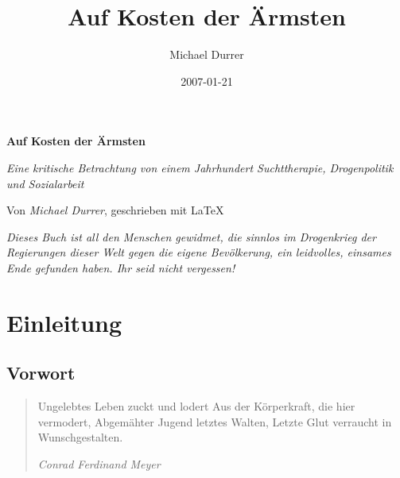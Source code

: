 \documentclass[b5paper,10pt,dvips,fleqn,titlepage,twoside]{book}
\author{Michael Durrer}
\title{Auf Kosten der Ärmsten}
\date{2007-01-21}
\begin{document}
\begin{titlepage}
\begin{center}
\begin{huge} \textbf{Auf Kosten der Ärmsten}\end{huge}
\newline
\textit{Eine kritische Betrachtung von einem Jahrhundert Suchttherapie, Drogenpolitik und Sozialarbeit}
\newline


\begin{small}Von \emph{Michael Durrer}, geschrieben mit \LaTeX \newline\end{small}
\end{center}
\end{titlepage}
\newpage
\tableofcontents
\newpage
\begin{center}
 \textit{Dieses Buch ist all den \emph{Menschen} gewidmet, die sinnlos im Drogenkrieg der Regierungen dieser Welt gegen die eigene Bevölkerung, ein leidvolles, einsames Ende gefunden haben. Ihr seid nicht vergessen!}
\end{center}

\part{Einleitung}
\chapter{Vorwort}
\begin{quotation}
Ungelebtes Leben zuckt und lodert
Aus der Körperkraft, die hier vermodert,
Abgemähter Jugend letztes Walten,
Letzte Glut verraucht in Wunschgestalten.\newline 
\begin{flushright}
\textit{Conrad Ferdinand Meyer} 
\end{flushright}

\end{quotation}
\end{document}
